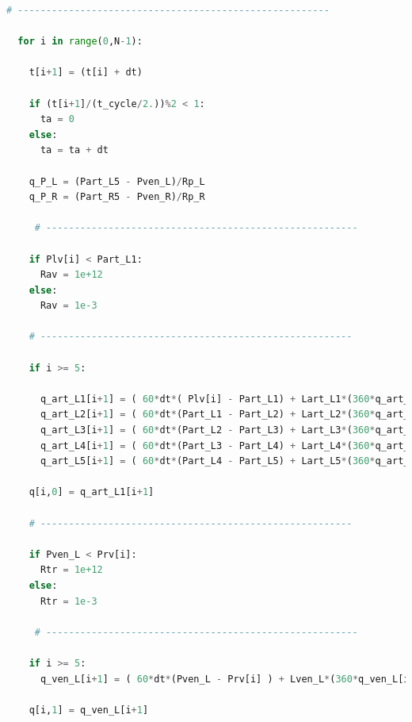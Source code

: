 \begin{lstlisting}[language=Python,caption={Математическая модель сердечно-сосудистой системы на языке программирования Python},label={list:cardiovascular_system_model}]
  # -------------------------------------------------------

  for i in range(0,N-1):

    t[i+1] = (t[i] + dt)

    if (t[i+1]/(t_cycle/2.))%2 < 1:
      ta = 0
    else:
      ta = ta + dt

    q_P_L = (Part_L5 - Pven_L)/Rp_L
    q_P_R = (Part_R5 - Pven_R)/Rp_R

	 # -------------------------------------------------------

    if Plv[i] < Part_L1:
      Rav = 1e+12
    else:
      Rav = 1e-3

    # -------------------------------------------------------

    if i >= 5:

      q_art_L1[i+1] = ( 60*dt*( Plv[i] - Part_L1) + Lart_L1*(360*q_art_L1[i] - 450*q_art_L1[i-1] + 400*q_art_L1[i-2] - 225*q_art_L1[i-3] + 72*q_art_L1[i-4] - 10*q_art_L1[i-5]) ) / (147*Lart_L1 + 60*dt*(Rart_L1 + Rav)) 
      q_art_L2[i+1] = ( 60*dt*(Part_L1 - Part_L2) + Lart_L2*(360*q_art_L2[i] - 450*q_art_L2[i-1] + 400*q_art_L2[i-2] - 225*q_art_L2[i-3] + 72*q_art_L2[i-4] - 10*q_art_L2[i-5]) ) / (147*Lart_L2 + 60*dt*Rart_L2)
      q_art_L3[i+1] = ( 60*dt*(Part_L2 - Part_L3) + Lart_L3*(360*q_art_L3[i] - 450*q_art_L3[i-1] + 400*q_art_L3[i-2] - 225*q_art_L3[i-3] + 72*q_art_L3[i-4] - 10*q_art_L3[i-5]) ) / (147*Lart_L3 + 60*dt*Rart_L3)
      q_art_L4[i+1] = ( 60*dt*(Part_L3 - Part_L4) + Lart_L4*(360*q_art_L4[i] - 450*q_art_L4[i-1] + 400*q_art_L4[i-2] - 225*q_art_L4[i-3] + 72*q_art_L4[i-4] - 10*q_art_L4[i-5]) ) / (147*Lart_L4 + 60*dt*Rart_L4)
      q_art_L5[i+1] = ( 60*dt*(Part_L4 - Part_L5) + Lart_L5*(360*q_art_L5[i] - 450*q_art_L5[i-1] + 400*q_art_L5[i-2] - 225*q_art_L5[i-3] + 72*q_art_L5[i-4] - 10*q_art_L5[i-5]) ) / (147*Lart_L5 + 60*dt*Rart_L5)
         
    q[i,0] = q_art_L1[i+1]

    # -------------------------------------------------------

    if Pven_L < Prv[i]:
      Rtr = 1e+12
    else:
      Rtr = 1e-3

	 # -------------------------------------------------------

    if i >= 5:
      q_ven_L[i+1] = ( 60*dt*(Pven_L - Prv[i] ) + Lven_L*(360*q_ven_L[i] - 450*q_ven_L[i-1] + 400*q_ven_L[i-2] - 225*q_ven_L[i-3] + 72*q_ven_L[i-4] - 10*q_ven_L[i-5]) ) / (147*Lven_L + 60*dt*(Rven_L + Rtr)) 

    q[i,1] = q_ven_L[i+1]  
    

\end{lstlisting}
